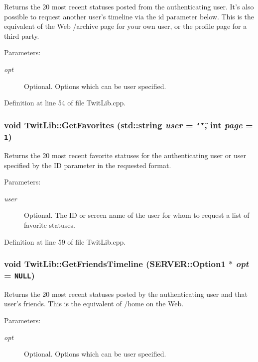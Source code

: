 Returns the 20 most recent statuses posted from the authenticating user. It's also possible to request another user's timeline via the id parameter below. This is the equivalent of the Web /archive page for your own user, or the profile page for a third party. \begin{Desc}
\item[Parameters:]
\begin{description}
\item[{\em opt}]Optional. Options which can be user specified. \end{description}
\end{Desc}


Definition at line 54 of file TwitLib.cpp.\hypertarget{classTwitLib_497063a88015c8c819a3b4195b2441d7}{
\subsubsection{\setlength{\rightskip}{0pt plus 5cm}void TwitLib::GetFavorites (std::string {\em user} = {\tt \char`\"{}\char`\"{}}, \/  int {\em page} = {\tt 1})}}
\label{classTwitLib_497063a88015c8c819a3b4195b2441d7}


Returns the 20 most recent favorite statuses for the authenticating user or user specified by the ID parameter in the requested format. \begin{Desc}
\item[Parameters:]
\begin{description}
\item[{\em user}]Optional. The ID or screen name of the user for whom to request a list of favorite statuses. \end{description}
\end{Desc}


Definition at line 59 of file TwitLib.cpp.\hypertarget{classTwitLib_481b7acf927c6421b1af4004fad544cc}{
\subsubsection{\setlength{\rightskip}{0pt plus 5cm}void TwitLib::GetFriendsTimeline ({\bf SERVER::Option1} $\ast$ {\em opt} = {\tt NULL})}}
\label{classTwitLib_481b7acf927c6421b1af4004fad544cc}


Returns the 20 most recent statuses posted by the authenticating user and that user's friends. This is the equivalent of /home on the Web. \begin{Desc}
\item[Parameters:]
\begin{description}
\item[{\em opt}]Optional. Options which can be user specified. \end{description}
\end{Desc}


